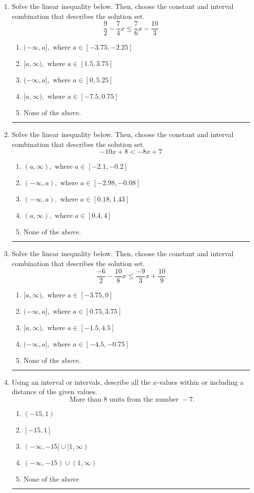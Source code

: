 \documentclass[14pt]{extbook}
\newcommand{\litem}[1]{\item#1\hspace*{-1cm}\rule{\textwidth}{0.4pt}}
\begin{document}
\begin{enumerate}
{\begin{enumerate}[label=\Alph*.]
\end{enumerate} }
\litem{
Solve the linear inequality below. Then, choose the constant and interval combination that describes the solution set.\[ \frac{9}{2} - \frac{7}{4} x \leq \frac{7}{6} x - \frac{10}{3} \]\begin{enumerate}[label=\Alph*.]
\item \( (-\infty, a], \text{ where } a \in [-3.75, -2.25] \)
\item \( [a, \infty), \text{ where } a \in [1.5, 3.75] \)
\item \( (-\infty, a], \text{ where } a \in [0, 5.25] \)
\item \( [a, \infty), \text{ where } a \in [-7.5, 0.75] \)
\item \( \text{None of the above}. \)

\end{enumerate} }
\litem{
Solve the linear inequality below. Then, choose the constant and interval combination that describes the solution set.\[ -10x + 8 < -8x + 7 \]\begin{enumerate}[label=\Alph*.]
\item \( (a, \infty), \text{ where } a \in [-2.1, -0.2] \)
\item \( (-\infty, a), \text{ where } a \in [-2.98, -0.08] \)
\item \( (-\infty, a), \text{ where } a \in [0.18, 1.43] \)
\item \( (a, \infty), \text{ where } a \in [0.4, 4] \)
\item \( \text{None of the above}. \)

\end{enumerate} }
\litem{
Solve the linear inequality below. Then, choose the constant and interval combination that describes the solution set.\[ \frac{-6}{2} - \frac{10}{8} x \leq \frac{-9}{3} x + \frac{10}{9} \]\begin{enumerate}[label=\Alph*.]
\item \( [a, \infty), \text{ where } a \in [-3.75, 0] \)
\item \( (-\infty, a], \text{ where } a \in [0.75, 3.75] \)
\item \( [a, \infty), \text{ where } a \in [-1.5, 4.5] \)
\item \( (-\infty, a], \text{ where } a \in [-4.5, -0.75] \)
\item \( \text{None of the above}. \)

\end{enumerate} }
\litem{
Using an interval or intervals, describe all the $x$-values within or including a distance of the given values.\[ \text{ More than } 8 \text{ units from the number } -7. \]\begin{enumerate}[label=\Alph*.]
\item \( (-15, 1) \)
\item \( [-15, 1] \)
\item \( (-\infty, -15] \cup [1, \infty) \)
\item \( (-\infty, -15) \cup (1, \infty) \)
\item \( \text{None of the above} \)


\end{enumerate}}
\end{enumerate}
\end{document}
